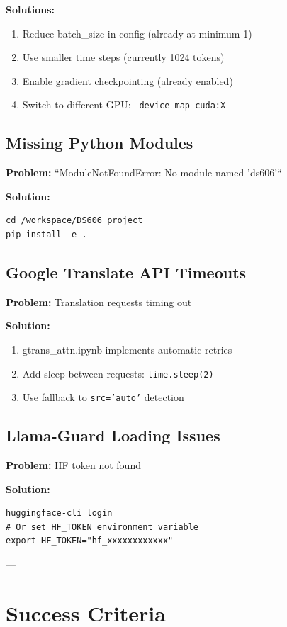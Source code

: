 \documentclass[11pt,a4paper]{article}
\begin{document}
\textbf{Solutions:}
\begin{enumerate}
    \item Reduce batch\_size in config (already at minimum 1)
    \item Use smaller time steps (currently 1024 tokens)
    \item Enable gradient checkpointing (already enabled)
    \item Switch to different GPU: \texttt{--device-map cuda:X}
\end{enumerate}

\subsection{Missing Python Modules}

\textbf{Problem:} ``ModuleNotFoundError: No module named 'ds606'``

\textbf{Solution:}
\begin{verbatim}
cd /workspace/DS606_project
pip install -e .
\end{verbatim}

\subsection{Google Translate API Timeouts}

\textbf{Problem:} Translation requests timing out

\textbf{Solution:}
\begin{enumerate}
    \item gtrans\_attn.ipynb implements automatic retries
    \item Add sleep between requests: \texttt{time.sleep(2)}
    \item Use fallback to \texttt{src='auto'} detection
\end{enumerate}

\subsection{Llama-Guard Loading Issues}

\textbf{Problem:} HF token not found

\textbf{Solution:}
\begin{verbatim}
huggingface-cli login
# Or set HF_TOKEN environment variable
export HF_TOKEN="hf_xxxxxxxxxxxx"
\end{verbatim}

---

\section{Success Criteria}
\end{document}
